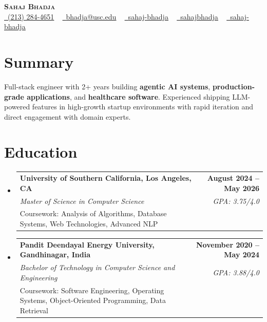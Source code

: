 \documentclass[letterpaper,10pt]{article}
\makeatletter
\newcommand{\resumeEduSubheading}[5]{\vspace{-1pt}\item\begin{tabular*}{1.0\textwidth}[t]{l@{\extracolsep{\fill}}r}\textbf{#1} & \textbf{\small #2} \\\textit{\small #3} & \textit{\small #4} \\\small #5 & \\\end{tabular*}\vspace{-4pt}}
\newcommand{\resumeSubHeadingListStart}{\begin{itemize}[leftmargin=0.0in, label={}]}
\newcommand{\resumeSubHeadingListEnd}{\end{itemize}}
\makeatother
\begin{document}
\begin{center}
{\Huge \scshape \textbf{Sahaj Bhadja}} \\ \vspace{1pt}
\small \href{tel:(213) 284-4651}{\faPhone\ \underline{(213) 284-4651}} ~ \href{mailto:bhadja@usc.edu}{\raisebox{-0.2\height}\faEnvelope\ \underline{bhadja@usc.edu}} ~
\href{https://www.linkedin.com/in/sahaj-bhadja/}{\raisebox{-0.2\height}\faLinkedin\ \underline{sahaj-bhadja}} ~ \href{https://github.com/SAHAJ-BHADJA}{\raisebox{-0.2\height}\faGithub\ \underline{sahajbhadja}} ~
\href{https://sahaj-bhadja.vercel.app/}{\raisebox{-0.2\height}\faGlobe\ \underline{sahaj-bhadja}}
\end{center}
\vspace{-18pt}
\section{Summary}
\begin{itemize}[leftmargin=0.15in, label={}]
\small{\item{Full-stack engineer with 2+ years building \textbf{agentic AI systems}, \textbf{production-grade applications}, and \textbf{healthcare software}. Experienced shipping LLM-powered features in high-growth startup environments with rapid iteration and direct engagement with domain experts.}}
\end{itemize}
\vspace{-16pt}
\section{Education}
\resumeSubHeadingListStart
\resumeEduSubheading{University of Southern California, Los Angeles, CA}{August 2024 -- May 2026}{Master of Science in Computer Science}{GPA: 3.75/4.0}{Coursework: Analysis of Algorithms, Database Systems, Web Technologies, Advanced NLP}
\vspace{-9pt}
\resumeEduSubheading{Pandit Deendayal Energy University, Gandhinagar, India}{November 2020 -- May 2024}{Bachelor of Technology in Computer Science and Engineering}{GPA: 3.88/4.0}{Coursework: Software Engineering, Operating Systems, Object-Oriented Programming, Data Retrieval}
\resumeSubHeadingListEnd
\vspace{-14pt}
\end{document}

